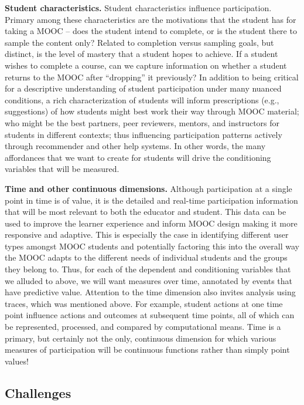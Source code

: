 \textbf{Student characteristics.} Student characteristics influence
participation. Primary among these characteristics are the motivations
that the student has for taking a MOOC -- does the student intend to
complete, or is the student there to sample the content only? Related to
completion versus sampling goals, but distinct, is the level of mastery
that a student hopes to achieve. If a student wishes to complete a
course, can we capture information on whether a student returns to the
MOOC after ``dropping'' it previously?  In addition to being critical for
a descriptive understanding of student participation under many nuanced
conditions, a rich characterization of students will inform
prescriptions (e.g., suggestions) of how students might best work their
way through MOOC material; who might be the best partners, peer
reviewers, mentors, and instructors for students in different contexts;
thus influencing participation patterns actively through recommender and
other help systems. In other words, the many affordances that we want to
create for students will drive the conditioning variables that will be
measured.  

\textbf{Time and other continuous dimensions.}  Although participation
at a single point in time is of value, it is the detailed and real-time
participation information that will be most relevant to both the
educator and student. This data can be used to improve the learner
experience and inform MOOC design making it more responsive and
adaptive. This is especially the case in identifying different user
types amongst MOOC students and potentially factoring this into the
overall way the MOOC adapts to the different needs of individual
students and the groups they belong to. Thus, for each of the dependent
and conditioning variables that we alluded to above, we will want
measures over time, annotated by events that have predictive value.
Attention to the time dimension also invites analysis using traces,
which was mentioned above. For example, student actions at one time
point influence actions and outcomes at subsequent time points, all of
which can be represented, processed, and compared by computational
means.  Time is a primary, but certainly not the only, continuous
dimension for which various measures of participation will be continuous
functions rather than simply point values!

\subsection{Challenges}

